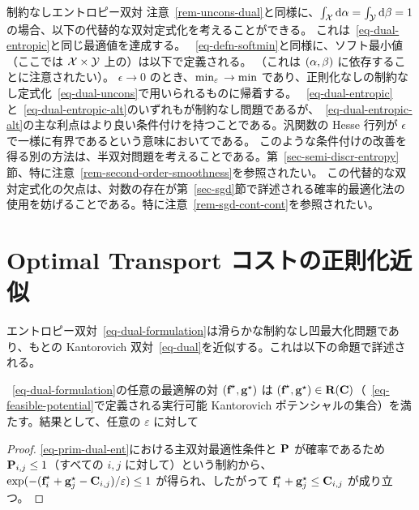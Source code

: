 \begin{rem2}{制約なしエントロピー双対}
注意~\ref{rem-uncons-dual}と同様に、$\int_\X \d\mu=\int_\Y\d\nu = 1$ の場合、以下の代替的な双対定式化を考えることができる。
これは~\eqref{eq-dual-entropic}と同じ最適値を達成する。
~\eqref{eq-defn-softmin}と同様に、ソフト最小値（ここでは $\X \times \Y$ 上の）は以下で定義される。
（これは $(\al,\be)$ に依存することに注意されたい）。
$\epsilon \rightarrow 0$ のとき、$\smine \rightarrow \min$ であり、正則化なしの制約なし定式化~\eqref{eq-dual-uncons}で用いられるものに帰着する。
~\eqref{eq-dual-entropic}と~\eqref{eq-dual-entropic-alt}のいずれもが制約なし問題であるが、~\eqref{eq-dual-entropic-alt}の主な利点はより良い条件付けを持つことである。汎関数の Hesse 行列が $\epsilon$ で一様に有界であるという意味においてである。
このような条件付けの改善を得る別の方法は、半双対問題を考えることである。第~\ref{sec-semi-discr-entropy}節、特に注意~\ref{rem-second-order-smoothness}を参照されたい。
この代替的な双対定式化の欠点は、対数の存在が第~\ref{sec-sgd}節で詳述される確率的最適化法の使用を妨げることである。特に注意~\ref{rem-sgd-cont-cont}を参照されたい。
\end{rem2}

\section{Optimal Transport コストの正則化近似}
\label{sec-regularized-cost}

エントロピー双対~\eqref{eq-dual-formulation}は滑らかな制約なし凹最大化問題であり、もとの Kantorovich 双対~\eqref{eq-dual}を近似する。これは以下の命題で詳述される。

\begin{prop}\label{prop-feasibility-dual}
~\eqref{eq-dual-formulation}の任意の最適解の対 $(\fD^\star,\gD^\star)$ は $(\fD^\star,\gD^\star) \in \PotentialsD(\C)$（~\eqref{eq-feasible-potential}で定義される実行可能 Kantorovich ポテンシャルの集合）を満たす。結果として、任意の $\varepsilon$ に対して
\end{prop}
\begin{proof}
	\eqref{eq-prim-dual-ent}における主双対最適性条件と $\P$ が確率であるため $\P_{i,j}\leq 1$（すべての $i,j$ に対して）という制約から、$\exp(-(\fD^\star_i+\gD^\star_j-\C_{i,j})/\varepsilon)\leq 1$ が得られ、したがって $\fD^\star_i+\gD^\star_j\leq\C_{i,j}$ が成り立つ。
\end{proof}

